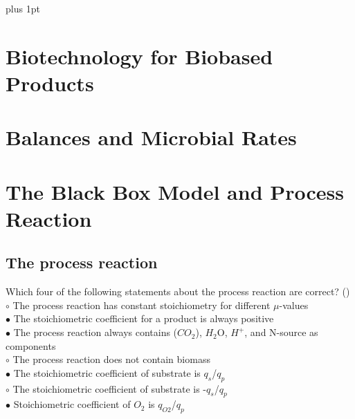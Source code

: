 \documentclass[]{beamer}
\begin{document}
\parskip=1cm plus 1pt
\section{Biotechnology for Biobased Products}
\section{Balances and Microbial Rates}
\section{The Black Box Model and Process Reaction}

\subsection{The process reaction}
\begin{frame}[shrink] {} 
\color{blue}
  Which four of the following statements about the process reaction are correct?
 ({\color{green}{Q1}})\\
\color{black}
\setlength{\parindent}{-0.4cm}
{\color{red}$\circ$} The process reaction has constant stoichiometry for different $\mu$-values  \\
{\color{red}$\bullet$} The stoichiometric coefficient for a product is always positive  \\
{\color{red}$\bullet$} The process reaction always contains ($CO_{2}$), $H_{2}$O, $H^{+}$, and N-source as components  \\
{\color{red}$\circ$} The process reaction does not contain biomass  \\
{\color{red}$\bullet$} The stoichiometric coefficient of substrate is $q_{s}$/$q_{p}$  \\
{\color{red}$\circ$} The stoichiometric coefficient of substrate is -$q_{s}$/$q_{p}$  \\
{\color{red}$\bullet$} Stoichiometric coefficient of $O_{2}$ is $q_{O2}$/$q_{p}$  \\
\end{frame}
\end{document}
